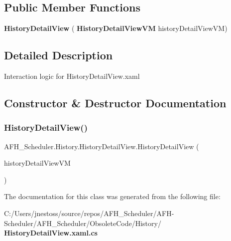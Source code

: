 \subsection*{Public Member Functions}
\begin{DoxyCompactItemize}
\item 
\textbf{ History\+Detail\+View} (\textbf{ History\+Detail\+View\+VM} history\+Detail\+View\+VM)
\end{DoxyCompactItemize}


\subsection{Detailed Description}
Interaction logic for History\+Detail\+View.\+xaml 



\subsection{Constructor \& Destructor Documentation}
\mbox{\label{class_a_f_h___scheduler_1_1_history_1_1_history_detail_view_a8ab00cd39ef75fc9fee3f427c28aa453}} 
\subsubsection{HistoryDetailView()}
{\footnotesize\ttfamily A\+F\+H\+\_\+\+Scheduler.\+History.\+History\+Detail\+View.\+History\+Detail\+View (\begin{DoxyParamCaption}\item[{\textbf{ History\+Detail\+View\+VM}}]{history\+Detail\+View\+VM }\end{DoxyParamCaption})}



The documentation for this class was generated from the following file\+:\begin{DoxyCompactItemize}
\item 
C\+:/\+Users/jnestoss/source/repos/\+A\+F\+H\+\_\+\+Scheduler/\+A\+F\+H-\/\+Scheduler/\+A\+F\+H\+\_\+\+Scheduler/\+Obsolete\+Code/\+History/\textbf{ History\+Detail\+View.\+xaml.\+cs}\end{DoxyCompactItemize}
